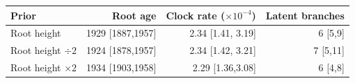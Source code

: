 
\begin{tabular}{lrrr}
    Prior & Root age & Clock rate ($\times 10^{-4}$)& Latent branches  \\ 
\toprule
Root height & 1929 [1887,1957]& 2.34 [1.41, 3.19] & 6 [5,9] \\
Root height $\div 2$ & 1924 [1878,1957] & 2.34 [1.42, 3.21] & 7 [5,11]\\
Root height $\times 2$ & 1934 [1903,1958] &2.29 [1.36,3.08] & 6 [4,8] \\
\bottomrule
\end{tabular}